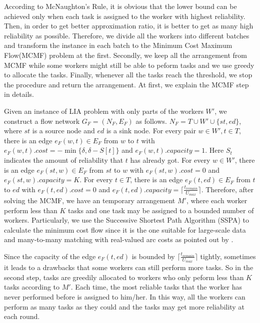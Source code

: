 According to McNaughton's Rule\cite{NaughtonRule}, it is obvious that the lower bound can be achieved only when each task is assigned to the worker with highest reliability.
Then, in order to get better approximation ratio, it is better to get as many high reliability as possible.
Therefore, we divide all the workers into different batches and transform the instance in each batch to the Minimum Cost Maximum Flow(MCMF) problem at the first.
Secondly, we keep all the arrangement from MCMF while some workers might still be able to peform tasks and we use greedy to allocate the tasks.
Finally, whenever all the tasks reach the threshold, we stop the procedure and return the arrangement.
At first, we explain the MCMF step in details.

Given an instance of LIA problem with only parts of the workers $W'$, we construct a flow network $G_F = (N_F, E_F)$ as follows.
$N_F = T \cup W' \cup \{st, ed\}$, where $st$ is a source node and $ed$ is a sink node. 
For every pair $w \in W', t \in T$, there is an edge $e_F(w, t) \in E_F$ from $w$ to $t$ with 
$e_F(w, t).cost = -\min\{\delta, \delta-S[t]\}$ and $e_F(w, t).capacity = 1$.
Here $S_{t}$ indicates the amount of reliability that $t$ has already got. 
For every $w \in W'$, there is an edge $e_F(st, w) \in E_F$ from $st$ to $w$ with
$e_F(st, w).cost = 0$ and $e_F(st, w).capacity = K$.
For every $t \in T$, there is an edge $e_F(t, ed) \in E_F$ from $t$ to $ed$ with 
$e_F(t, ed).cost = 0$ and $e_F(t, ed).capacity = \lceil \frac{t_{remain}}{U_{max}} \rceil$.
Therefore, after solving the MCMF, we have an temporary arrangement $M'$,
where each worker perform less than $K$ tasks and one task may be assigned to a bounded number of workers.
Particularly, we use the Successive Shortest Path Algorithm (SSPA) to calculate the
minimum cost flow since it is the one suitable for large-scale data and many-to-many matching with real-valued arc costs as pointed out by \cite{yiu2008capacity}.

Since the capacity of the edge $e_F(t, ed)$ is bounded by $\lceil \frac{t_{remain}}{U_{max}} \rceil$ tightly, 
sometimes it leads to a drawbacks that some workers can still perform more tasks.
So in the second step, tasks are greedily allocated to workers who only peform less than $K$ tasks according to $M'$.
Each time, the most reliable tasks that the worker has never performed before is assigned to him/her.
In this way, all the workers can perform as many tasks as they could and the tasks may get more reliability at each round.


